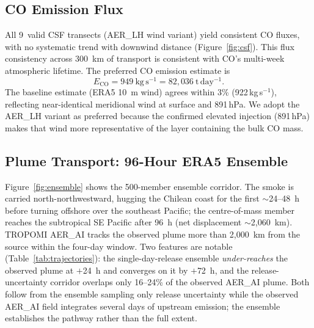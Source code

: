 \documentclass[draft]{agujournal2019}
\newcommand{\hPa}{\,hPa}
\newcommand{\kgs}{\,kg\,s$^{-1}$}
\begin{document}
\subsection{CO Emission Flux}
\label{sec:co_results}

All 9~valid CSF transects (AER\_LH wind variant) yield consistent CO fluxes, with no systematic trend with downwind distance (Figure~\ref{fig:csf}). This flux consistency across 300~km of transport is consistent with CO's multi-week atmospheric lifetime. The preferred CO emission estimate is
\begin{equation}
  E_\mathrm{CO} = 949~\mathrm{kg\,s^{-1}} = 82{,}036~\mathrm{t\,day^{-1}} .
  \label{eq:co_flux}
\end{equation}
The baseline estimate (ERA5 10~m wind) agrees within 3\% (922\kgs{}), reflecting near-identical meridional wind at surface and 891\hPa{}. We adopt the AER\_LH variant as preferred because the confirmed elevated injection (891\hPa) makes that wind more representative of the layer containing the bulk CO mass.

\subsection{Plume Transport: 96-Hour ERA5 Ensemble}
\label{sec:transport}

Figure~\ref{fig:ensemble} shows the 500-member ensemble corridor. The smoke is carried north-northwestward, hugging the Chilean coast for the first $\sim$24--48~h before turning offshore over the southeast Pacific; the centre-of-mass member reaches the subtropical SE Pacific after 96~h (net displacement $\sim$2{,}060~km). TROPOMI AER\_AI tracks the observed plume more than 2{,}000~km from the source within the four-day window. Two features are notable (Table~\ref{tab:trajectories}): the single-day-release ensemble \emph{under-reaches} the observed plume at $+$24~h and converges on it by $+$72~h, and the release-uncertainty corridor overlaps only 16--24\% of the observed AER\_AI plume. Both follow from the ensemble sampling only release uncertainty while the observed AER\_AI field integrates several days of upstream emission; the ensemble establishes the pathway rather than the full extent.
\end{document}
